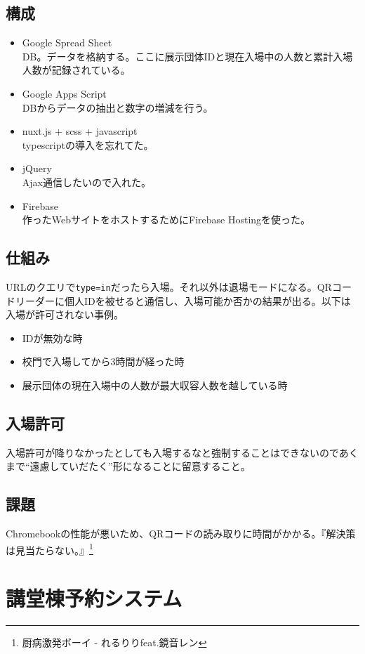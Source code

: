\documentclass[dvipdfmx,jb5]{jarticle}
\begin{document}
\subsection{構成}
\begin{itemize}
  \item Google Spread Sheet\\
  DB。データを格納する。ここに展示団体IDと現在入場中の人数と累計入場人数が記録されている。
   \item Google Apps Script\\
   DBからデータの抽出と数字の増減を行う。
   \item nuxt.js + scss + javascript\\
   typescriptの導入を忘れてた。
   \item jQuery\\
   Ajax通信したいので入れた。
   \item Firebase\\
   作ったWebサイトをホストするためにFirebase Hostingを使った。
  \end{itemize}

\subsection{仕組み}
URLのクエリで\verb|type=in|だったら入場。それ以外は退場モードになる。QRコードリーダーに個人IDを被せると通信し、入場可能か否かの結果が出る。以下は入場が許可されない事例。
\begin{itemize}
\item IDが無効な時
\item 校門で入場してから3時間が経った時
\item 展示団体の現在入場中の人数が最大収容人数を越している時
\end{itemize}

\subsection{入場許可}
入場許可が降りなかったとしても入場するなと強制することはできないのであくまで``遠慮していだたく''形になることに留意すること。

\subsection{課題}
Chromebookの性能が悪いため、QRコードの読み取りに時間がかかる。『解決策は見当たらない。』\footnote{厨病激発ボーイ - れるりりfeat.鏡音レン}

\section{講堂棟予約システム}
\end{document}
